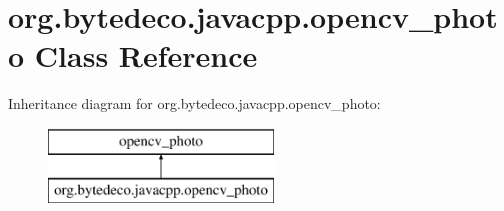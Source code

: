 \hypertarget{classorg_1_1bytedeco_1_1javacpp_1_1opencv__photo}{}\section{org.\+bytedeco.\+javacpp.\+opencv\+\_\+photo Class Reference}
\label{classorg_1_1bytedeco_1_1javacpp_1_1opencv__photo}
Inheritance diagram for org.\+bytedeco.\+javacpp.\+opencv\+\_\+photo\+:\begin{figure}[H]
\begin{center}
\leavevmode
\includegraphics[height=2.000000cm]{classorg_1_1bytedeco_1_1javacpp_1_1opencv__photo}
\end{center}
\end{figure}
